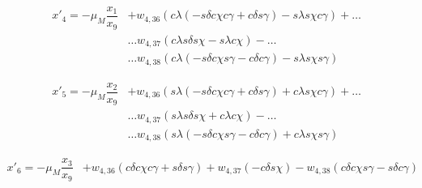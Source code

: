 \begin{equation} \label{eq:u4Com}
\begin{split}
x'_{4}= -\mu_{M}\dfrac{x_{1}}{x_{9}}&+w_{4,36}\left( c\lambda\left(-s\delta c\chi c\gamma +c\delta s\gamma \right)-s\lambda s\chi c\gamma \right)+ \dots \\
& \dotsc  w_{4,37} \left( c\lambda s\delta s\chi -s\lambda c\chi\right)-\dots \\
& \dotsc w_{4,38} \left( c\lambda\left(-s\delta c\chi s\gamma -c\delta c\gamma \right)-s\lambda s\chi s\gamma \right)
\end{split}
\end{equation}

\begin{equation} \label{eq:u5Com}
\begin{split}
x'_{5}= -\mu_{M}\dfrac{x_{2}}{x_{9}}&+w_{4,36} \left( s\lambda\left(-s\delta c\chi c\gamma +c\delta s\gamma \right)+c\lambda s\chi c\gamma \right)+ \dots \\
& \dotsc w_{4,37} \left( s\lambda s\delta s\chi +c\lambda c\chi \right) - \dots \\
& \dotsc w_{4,38} \left( s\lambda\left(-s\delta c\chi s\gamma -c\delta c\gamma \right)+c\lambda s\chi s\gamma \right)
\end{split}
\end{equation} 

\begin{equation} \label{eq:u6Com}
\begin{split}
x'_{6}= -\mu_{M}\dfrac{x_{3}}{x_{9}}&+w_{4,36} \left( c\delta c\chi c\gamma +s\delta s\gamma\right) +  w_{4,37} \left(  -c\delta s\chi \right)  -w_{4,38} \left(  c\delta c\chi s\gamma -s\delta c\gamma \right)
\end{split}
\end{equation}

